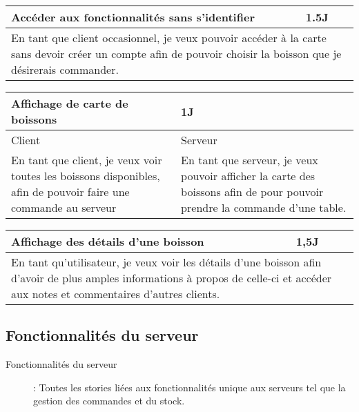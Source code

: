 \begin{center}
	\begin{tabular}{ll}
		\hline
			\multicolumn{1}{|p{14cm}|}{Accéder aux fonctionnalités sans s’identifier} & \multicolumn{1}{p{0.7cm}|}{1.5J} \\ 
		\hline
			\multicolumn{2}{|p{15cm}|}{En tant que client occasionnel, je veux pouvoir
			accéder à la carte sans devoir créer un compte afin de pouvoir choisir
			la boisson que je désirerais commander.} \\
		\hline
	\end{tabular}

	\vspace{1cm}
	
	\begin{tabular}{lll}
		\hline
			\multicolumn{2}{|p{14cm}}{Affichage de carte de boissons } & \multicolumn{1}{|p{0.7cm}|}{1J} \\
		\hline
			\multicolumn{1}{|p{7cm}}{Client} & \multicolumn{2}{|p{7cm}|}{Serveur} \\ 
		\hline
			\multicolumn{1}{|p{7cm}}{En tant que client, je veux voir toutes les boissons disponibles, 
			afin de pouvoir faire une commande au serveur } & \multicolumn{2}{|p{7cm}|}{En tant que 
			serveur, je veux pouvoir afficher la carte des boissons afin de pour pouvoir prendre la commande d'une table.} \\ 
		\hline
	\end{tabular}

	\vspace{1cm}
	
	\begin{tabular}{ll}
		\hline
			\multicolumn{1}{|p{14cm}|}{Affichage des détails d'une boisson} & \multicolumn{1}{p{0.7cm}|}{1,5J}\\ 
		\hline
			\multicolumn{2}{|p{15cm}|}{En tant qu'utilisateur, je veux voir les détails d'une 
			boisson afin d'avoir de plus amples informations à propos de celle-ci et accéder 
			aux notes et commentaires d'autres clients.}\\
		\hline
	\end{tabular}
\end{center}

\subsection{Fonctionnalités du serveur}
\begin{description}
	\item[Fonctionnalités du serveur] : Toutes les stories liées aux fonctionnalités
	unique aux serveurs tel que la gestion des commandes et du stock.
\end{description}

